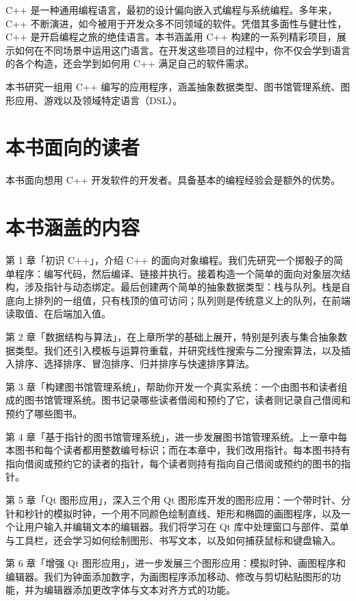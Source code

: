 \renewcommand{\codeInset}{18bp}
C++ 是一种通用编程语言，最初的设计偏向嵌入式编程与系统编程。多年来，C++ 不断演进，如今被用于开发众多不同领域的软件。凭借其多面性与健壮性，C++ 是开启编程之旅的绝佳语言。本书涵盖用 C++ 构建的一系列精彩项目，展示如何在不同场景中运用这门语言。在开发这些项目的过程中，你不仅会学到语言的各个构造，还会学到如何用 C++ 满足自己的软件需求。

本书研究一组用 C++ 编写的应用程序，涵盖抽象数据类型、图书馆管理系统、图形应用、游戏以及领域特定语言（DSL）。

\section*{本书面向的读者}

本书面向想用 C++ 开发软件的开发者。具备基本的编程经验会是额外的优势。

\section*{本书涵盖的内容}

第 1 章「初识 C++」，介绍 C++ 的面向对象编程。我们先研究一个掷骰子的简单程序：编写代码，然后编译、链接并执行。接着构造一个简单的面向对象层次结构，涉及指针与动态绑定。最后创建两个简单的抽象数据类型：栈与队列。栈是自底向上排列的一组值，只有栈顶的值可访问；队列则是传统意义上的队列，在前端读取值、在后端加入值。

第 2 章「数据结构与算法」，在上章所学的基础上展开，特别是列表与集合抽象数据类型。我们还引入模板与运算符重载，并研究线性搜索与二分搜索算法，以及插入排序、选择排序、冒泡排序、归并排序与快速排序算法。

第 3 章「构建图书馆管理系统」，帮助你开发一个真实系统：一个由图书和读者组成的图书馆管理系统。图书记录哪些读者借阅和预约了它，读者则记录自己借阅和预约了哪些图书。

第 4 章「基于指针的图书馆管理系统」，进一步发展图书馆管理系统。上一章中每本图书和每个读者都用整数编号标识；而在本章中，我们改用指针。每本图书持有指向借阅或预约它的读者的指针，每个读者则持有指向自己借阅或预约的图书的指针。

第 5 章「Qt 图形应用」，深入三个用 Qt 图形库开发的图形应用：一个带时针、分针和秒针的模拟时钟，一个用不同颜色绘制直线、矩形和椭圆的画图程序，以及一个让用户输入并编辑文本的编辑器。我们将学习在 Qt 库中处理窗口与部件、菜单与工具栏，还会学习如何绘制图形、书写文本，以及如何捕获鼠标和键盘输入。

第 6 章「增强 Qt 图形应用」，进一步发展三个图形应用：模拟时钟、画图程序和编辑器。我们为钟面添加数字，为画图程序添加移动、修改与剪切粘贴图形的功能，并为编辑器添加更改字体与文本对齐方式的功能。

